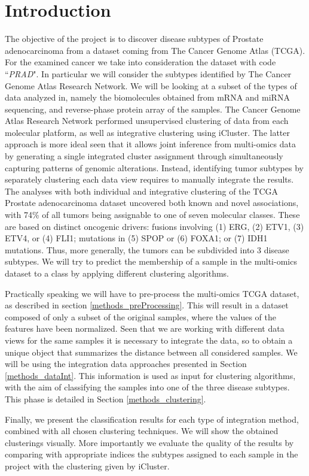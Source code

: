 \chapter{Introduction}\label{introduction}
The objective of the project is to discover disease subtypes of Prostate adenocarcinoma from a dataset coming from The Cancer Genome Atlas (TCGA)\cite{hutter2018TCGA}. For the examined cancer we take into consideration the dataset with code ``\textit{PRAD}". In particular we will consider the subtypes identified by The Cancer Genome Atlas Research Network\cite{abeshouse2015molecularPRAD}. We will be looking at a subset of the types of data analyzed in\cite{abeshouse2015molecularPRAD}, namely the biomolecules  obtained from mRNA and miRNA sequencing, and reverse-phase protein array of the samples. The Cancer Genome Atlas Research Network performed unsupervised
clustering of data from each molecular platform, as well as integrative clustering using iCluster\cite{shen2009integrative}. The latter approach is more ideal seen that it allows joint inference from multi-omics data by generating a single integrated cluster assignment through simultaneously capturing patterns of genomic alterations. Instead, identifying tumor subtypes by separately clustering each data view requires to manually integrate the results.
The analyses with both individual and integrative clustering of the TCGA Prostate adenocarcinoma dataset uncovered both known and novel associations, with 74\% of all tumors being assignable to one of seven molecular classes. These are based on distinct oncogenic drivers: fusions involving (1) ERG, (2) ETV1, (3) ETV4, or (4) FLI1; mutations in (5) SPOP
or (6) FOXA1; or (7) IDH1 mutations. Thus, more generally, the tumors can be subdivided into 3 disease subtypes. We will try to predict the membership of a sample in the multi-omics dataset to a class by applying different clustering algorithms.\newline

Practically speaking we will have to pre-process the multi-omics TCGA dataset, as described in section \ref{methods_preProcessing}. This will result in a dataset composed of only a subset of the original samples, where the values of the features have been normalized. Seen that we are working with different data views for the same samples it is necessary to integrate the data, so to obtain a unique object that summarizes the distance between all considered samples. We will be using the integration data approaches presented in Section \ref{methods_dataInt}. This information is used as input for clustering algorithms, with the aim of classifying the samples into one of the three disease subtypes. This phase is detailed in Section \ref{methods_clustering}.

Finally, we present the classification results for each type of integration method, combined with all chosen clustering techniques. We will show the obtained clusterings visually. More importantly we evaluate the quality of the results by comparing with appropriate indices the subtypes assigned to each sample in the project with the clustering given by iCluster.